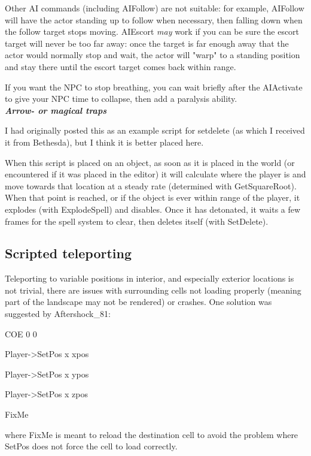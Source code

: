 Other AI commands (including AIFollow) are not suitable: for example,
AIFollow will have the actor standing up to follow when necessary, then
falling down when the follow target stops moving. AIEscort \emph{may}
work if you can be sure the escort target will never be too far away:
once the target is far enough away that the actor would normally stop
and wait, the actor will "warp" to a standing position and stay there
until the escort target comes back within range.

If you want the NPC to stop breathing, you can wait briefly after the
AIActivate to give your NPC time to collapse, then add a paralysis
ability.\\
\emph{\textbf{Arrow- or magical traps}}

I had originally posted this as an example script for setdelete (as
which I received it from Bethesda), but I think it is better placed
here.

When this script is placed on an object, as soon as it is placed in the
world (or encountered if it was placed in the editor) it will calculate
where the player is and move towards that location at a steady rate
(determined with GetSquareRoot). When that point is reached, or if the
object is ever within range of the player, it explodes (with
ExplodeSpell) and disables. Once it has detonated, it waits a few frames
for the spell system to clear, then deletes itself (with SetDelete).



\hypertarget{scripted-teleporting}{%
\subsection{Scripted teleporting}\label{scripted-teleporting}}

Teleporting to variable positions in interior, and especially exterior
locations is not trivial, there are issues with surrounding cells not
loading properly (meaning part of the landscape may not be rendered) or
crashes. One solution was suggested by Aftershock\_81:

COE 0 0

Player-\textgreater SetPos x xpos

Player-\textgreater SetPos x ypos

Player-\textgreater SetPos x zpos

FixMe

where FixMe is meant to reload the destination cell to avoid the problem
where SetPos does not force the cell to load correctly.

